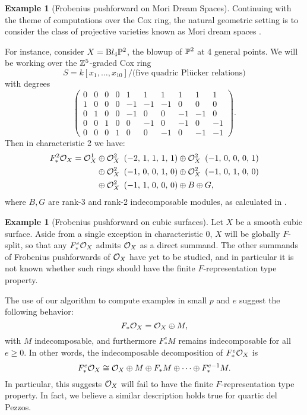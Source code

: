 \documentclass[12pt]{article}
\def\Bl{\mathrm Bl}
\theoremstyle{theorem}
\numberwithin{thm}{section}
\theoremstyle{definition}
\newtheorem{exa}[thm]{Example}
\begin{document}
\begin{exa}[Frobenius pushforward on Mori Dream Spaces]
  Continuing with the theme of computations over the Cox ring, the natural geometric setting is to consider the class of projective varieties known as Mori dream spaces \cite{HK00}.

  For instance, consider $X = \Bl_4\P^2$, the blowup of $\P^2$ at 4 general points. We will be working over the $\Z^5$-graded Cox ring
  \[ S = k[x_1,\dots,x_{10}]/\text{(five quadric Pl\"ucker relations)} \]
  with degrees
    \[
    \left(\!\begin{array}{rrrrrrrrrr}
      0&0&0&0&1&1&1&1&1&1 \\
      1&0&0&0&-1&-1&-1&0&0&0 \\
      0&1&0&0&-1&0&0&-1&-1&0 \\
      0&0&1&0&0&-1&0&-1&0&-1 \\
      0&0&0&1&0&0&-1&0&-1&-1
    \end{array}\!\right).
    \]
    Then in characteristic 2 we have:
    \begin{align*}
      F_*^2\O_X = {\O_{X}^{1}}
      &\oplus {\O_{X}^{2}\ \left(-2,\,1,\,1,\,1,\,1\right)} \oplus {\O_{X}^{2}\ \left(-1,\,0,\,0,\,0,\,1\right)} \\
      &\oplus {\O_{X}^{2}\ \left(-1,\,0,\,0,\,1,\,0\right)} \oplus {\O_{X}^{2}\ \left(-1,\,0,\,1,\,0,\,0\right)} \\
      &\oplus {\O_{X}^{2}\ \left(-1,\,1,\,0,\,0,\,0\right)} \oplus B \oplus G,
    \end{align*}
    where $B, G$ are rank-3 and rank-2 indecomposable modules, as calculated in \cite{Hara15}.
\end{exa}

\begin{exa}[Frobenius pushforward on cubic surfaces]
  Let $X$ be a smooth cubic surface. Aside from a single exception in characteristic 0, $X$ will be globally $F$-split, so that any $F^e_*\O_X $ admits $\O_X$ as a direct summand.
  The other summands of Frobenius pushforwards of $\O_X$ have yet to be studied, and in particular it is not known whether such rings should have the finite $F$-representation type property.

  The use of our algorithm to compute examples in small $p$ and $e$ suggest the following behavior:
  $$ F_* \O_X = \O_X\oplus M, $$
  with $M$ indecomposable, and furthermore $F_*^e M$ remains indecomposable for all $e\geq 0$. In other words, the indecomposable decomposition of $F^e_* \O_X$ is
  $$ F_*^e \O_X \cong \O_X\oplus M\oplus F_* M\oplus\dots\oplus F_*^{e-1}M. $$
  In particular, this suggests $\O_X$ will fail to have the finite $F$-representation type property.
  In fact, we believe a similar description holds true for quartic del Pezzos.
\end{exa}
\end{document}
